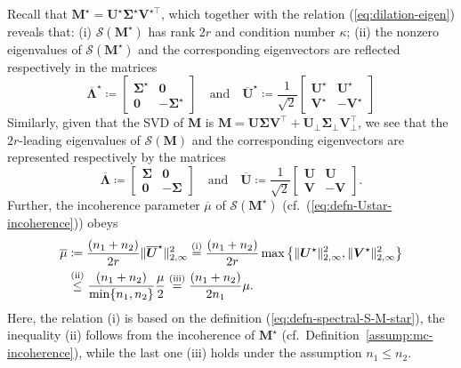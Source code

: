 Recall that $\bm{M}^{\star}=\bm{U}^{\star}\bm{\Sigma}^{\star}\bm{V}^{\star\top}$, which together with the relation (\ref{eq:dilation-eigen}) reveals that: (i) $\mathcal{S}(\bm{M}^{\star})$ has rank $2r$ and condition number $\kappa$; (ii) the nonzero eigenvalues of $\mathcal{S}(\bm{M}^{\star})$ and the corresponding eigenvectors are reflected respectively in the  matrices
\begin{equation}
\overline{\bm{\Lambda}}^{\star}\coloneqq\left[\begin{array}{cc}
\bm{\Sigma}^{\star} & \bm{0}\\
\bm{0} & -\bm{\Sigma}^{\star}
\end{array}\right]	
\quad\text{and}\quad
\overline{\bm{U}}^{\star}\coloneqq\frac{1}{\sqrt{2}}\left[\begin{array}{cc}
\bm{U}^{\star} & \bm{U}^{\star}\\
\bm{V}^{\star} & -\bm{V}^{\star}
\end{array}\right]
	\label{eq:defn-spectral-S-M-star}
\end{equation}
%
Similarly, given that the SVD of $\bm{M}$ is $\bm{M}=\bm{U}\bm{\Sigma}\bm{V}^{\top}+\bm{U}_{\perp}\bm{\Sigma}_{\perp}\bm{V}_{\perp}^{\top}$, we see that the $2r$-leading eigenvalues of $\mathcal{S}(\bm{M})$ and the corresponding eigenvectors are represented respectively by the matrices
\[
\overline{\bm{\Lambda}}\coloneqq\left[\begin{array}{cc}
\bm{\Sigma} & \bm{0}\\
\bm{0} & -\bm{\Sigma}
\end{array}\right]
\quad\text{and}\quad
\overline{\bm{U}}\coloneqq\frac{1}{\sqrt{2}}\left[\begin{array}{cc}
\bm{U} & \bm{U}\\
\bm{V} & -\bm{V}
\end{array}\right]. 
\]
%
 Further, the incoherence parameter $\overline{\mu}$
of $\mathcal{S}(\bm{M}^{\star})$ (cf.~(\ref{eq:defn-Ustar-incoherence}))
obeys
\begin{align}
\overline{\mu} & \coloneqq\frac{(n_{1}+n_{2})}{2r}\|\overline{\bm{U}}^{\star}\|_{2,\infty}^{2}
	\overset{(\text{i})}{=}  \frac{(n_{1}+n_{2})}{2r}\max\big\{\|\bm{U}^{\star}\|_{2,\infty}^{2},\|\bm{V}^{\star}\|_{2,\infty}^{2}\big\} \notag\\
 & \overset{(\text{ii})}{\leq}\frac{(n_{1}+n_{2})}{\min\{n_{1},n_{2}\}}\frac{\mu}{2}\overset{(\text{iii})}{=}\frac{(n_{1}+n_{2})}{2n_{1}}\mu.
	\label{eq:mu-bar-general}
\end{align}
Here, the relation (i) is based on the definition (\ref{eq:defn-spectral-S-M-star}),
the  inequality (ii) follows from the incoherence of $\bm{M}^{\star}$
(cf.~Definition~\ref{assump:mc-incoherence}), while the last one (iii)
holds under the assumption $n_{1}\leq n_{2}$. 

